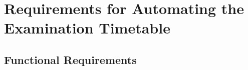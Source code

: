 \documentclass[a4paper,12pt]{article}
\begin{document}
\section{Requirements for Automating the Examination Timetable}
\subsection{Functional Requirements}

        
\end{document}
